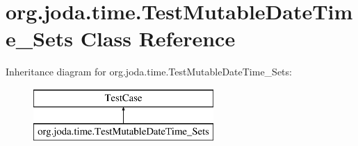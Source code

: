 \hypertarget{classorg_1_1joda_1_1time_1_1_test_mutable_date_time___sets}{\section{org.\-joda.\-time.\-Test\-Mutable\-Date\-Time\-\_\-\-Sets Class Reference}
\label{classorg_1_1joda_1_1time_1_1_test_mutable_date_time___sets}
}
Inheritance diagram for org.\-joda.\-time.\-Test\-Mutable\-Date\-Time\-\_\-\-Sets\-:\begin{figure}[H]
\begin{center}
\leavevmode
\includegraphics[height=2.000000cm]{classorg_1_1joda_1_1time_1_1_test_mutable_date_time___sets}
\end{center}
\end{figure}
